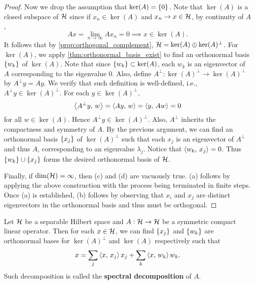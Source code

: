 \begin{proof}
    Now we drop the assumption that $\ker(A) = \left\{ {0} \right\}$. Note that $\ker(A)$ is a 
    closed subspace of $\mathcal{H}$ since if $x_n\in\ker(A)$ and $x_n\to x\in\mathcal{H}$, by continuity 
    of $A$, 
    \begin{equation*}
        Ax = \lim_{n\to\infty} Ax_n = 0
        \implies x\in\ker(A).
    \end{equation*} 
    It follows that by \cref{prop:orthogonal_complement}, $\mathcal{H} = \ker(A)\oplus\ker(A)^\perp$. 
    For $\ker(A)$, we apply \cref{thm:orthonormal_basis_exist} to find an orthonormal 
    basis $\left\{ {w_k} \right\}$ of $\ker(A)$. Note that since $\left\{ {w_k} \right\}\subset \ker(A)$, each 
    $w_k$ is an eigenvector of $A$ corresponding to the eigenvalue $0$. Also, 
    define $A^\perp:\ker(A)^\perp\to\ker(A)^\perp$ by $A^\perp y = Ay$. We verify 
    that such definition is well-defined, i.e., $A^\perp y\in\ker(A)^\perp$. For 
    each $y\in\ker(A)^\perp$,
    \begin{equation*}
        \left\langle {A^\perp y},\, {w} \right\rangle = \left\langle {Ay},\, {w} \right\rangle = \left\langle {y},\, {Aw} \right\rangle = 0
    \end{equation*}
    for all $w\in\ker(A)$. Hence $A^\perp y\in\ker(A)^\perp$. Also, $A^\perp$ inherits 
    the compactness and symmetry of $A$. By the previous argument, we can find an 
    orthonormal basis $\left\{ {x_j} \right\}$ of $\ker(A)^\perp$ such that each $x_j$ is an 
    eigenvector of $A^\perp$ and thus $A$, corresponding to an eigenvalue $\lambda_j$. 
    Notice that $\left\langle {w_k},\, {x_j} \right\rangle = 0$. Thus $\left\{ {w_k} \right\}\cup\left\{ {x_j} \right\}$ forms the desired 
    orthonormal basis of $\mathcal{H}$. 

    Finally, if $\dim(\mathcal{H}) = \infty$, then (c) and (d) are vacuously true. 
    (a) follows by applying the above construction with the process 
    being terminated in finite steps. Once (a) is established, (b) follows 
    by observing that $x_i$ and $x_j$ are distinct eigenvectors in the orthonormal 
    basis and thus must be orthogonal.
\end{proof}

\begin{definition}
    Let $\mathcal{H}$ be a separable Hilbert space and $A:\mathcal{H}\to\mathcal{H}$ be a symmetric compact 
    linear operator. Then for each $x\in\mathcal{H}$, we can find $\left\{ {x_j} \right\}$ and $\left\{ {w_k} \right\}$ 
    are orthonormal bases for $\ker(A)^\perp$ and $\ker(A)$ respectively such that 
    \begin{equation*}
        x = \sum_j\left\langle {x},\, {x_j} \right\rangle x_j + \sum_k\left\langle {x},\, {w_k} \right\rangle w_k.
    \end{equation*}
    Such decomposition is called the \textbf{spectral decomposition} of $A$.
\end{definition}

